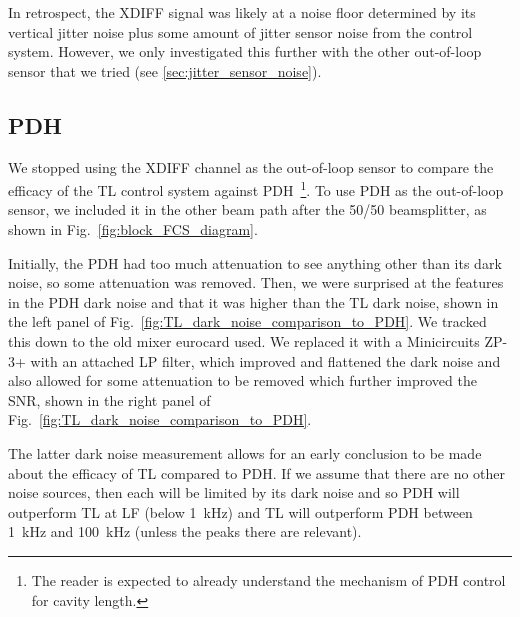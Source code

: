 \documentclass[aps,pra,superscriptaddress,reprint,nofootinbib]{revtex4-1}
\begin{document}
In retrospect, the XDIFF signal was likely at a noise floor determined by its vertical jitter noise plus some amount of jitter sensor noise from the control system. However, we only investigated this further with the other out-of-loop sensor that we tried (see \ref{sec:jitter_sensor_noise}).


\subsection{PDH}
\label{sec:PDH_out-of-loop}

\begin{figure*}
	\caption{SR785 measurements from 2021-01-13/14 of the TL and PDH dark noise. Showing PDH dark noise from the old eurocard mixer (panel a, left) and from the new mixer (panel b, right). The new mixer flattens the PDH dark noise and brings it under TL at LF.}
	\label{fig:TL_dark_noise_comparison_to_PDH}
\end{figure*}

We stopped using the XDIFF channel as the out-of-loop sensor to compare the efficacy of the TL control system against PDH~\footnote{The reader is expected to already understand the mechanism of PDH control for cavity length.}. To use PDH as the out-of-loop sensor, we included it in the other beam path after the 50/50 beamsplitter, as shown in Fig.~\ref{fig:block_FCS_diagram}.

Initially, the PDH had too much attenuation to see anything other than its dark noise, so some attenuation was removed. Then, we were surprised at the features in the PDH dark noise and that it was higher than the TL dark noise, shown in the left panel of Fig.~\ref{fig:TL_dark_noise_comparison_to_PDH}. We tracked this down to the old mixer eurocard used. We replaced it with a Minicircuits ZP-3+ with an attached LP filter, which improved and flattened the dark noise and also allowed for some attenuation to be removed which further improved the SNR, shown in the right panel of Fig.~\ref{fig:TL_dark_noise_comparison_to_PDH}.

The latter dark noise measurement allows for an early conclusion to be made about the efficacy of TL compared to PDH. If we assume that there are no other noise sources, then each will be limited by its dark noise and so PDH will outperform TL at LF (below 1~kHz) and TL will outperform PDH between 1~kHz and 100~kHz (unless the peaks there are relevant).
\end{document}
